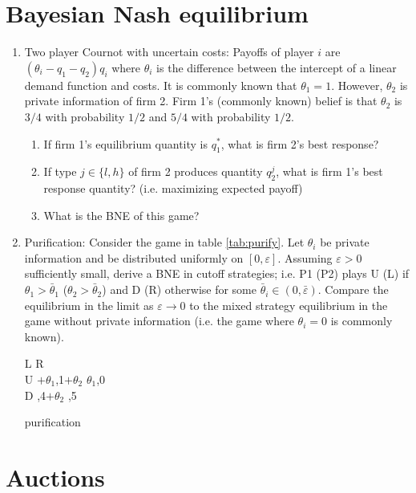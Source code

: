 \documentclass[a4paper,12pt]{article}
\begin{document}
\section{Bayesian Nash equilibrium}
\label{sec:Bayes-nash-eq}
\begin{enumerate}
\item Two player Cournot with uncertain costs: Payoffs of player $i$ are $(\theta _i-q_1-q_2)q_i$ where $\theta _i$ is the difference between the intercept of a linear demand function and costs. It is commonly known that $\theta _1=1$. However, $\theta _2$ is private information of firm 2. Firm 1's (commonly known) belief is that $\theta _2$ is $3/4$ with probability $1/2$ and $5/4$ with probability $1/2$.
  \begin{enumerate}
  \item If firm 1's equilibrium quantity is $q_1^*$, what is firm 2's best response?
  \item If type $j\in\{l,h\}$ of firm 2 produces quantity $q_2^j$, what is firm 1's best response quantity? (i.e. maximizing expected payoff)
    \item What is the BNE of this game?
  \end{enumerate}
\item Purification: Consider the game in table \ref{tab:purify}. Let $\theta _i$ be private information and be distributed uniformly on $[0 ,\varepsilon ]$. Assuming $\varepsilon >0$ sufficiently small, derive a BNE in cutoff strategies; i.e. P1 (P2) plays U (L) if $\theta _1>\bar{\theta }_1$ ($\theta _2>\bar{\theta }_2$) and D (R) otherwise for some $\bar \theta_i\in(0,\bar{\varepsilon })$. Compare the equilibrium in the limit as $\varepsilon \rightarrow 0$ to the mixed strategy equilibrium in the game without private information (i.e. the game where $\theta _i=0$ is commonly known). 
     \begin{table}[h]
\centering
 \begin{game}{2}{2}
       \> L  \>R\\ %
U   $+\theta_1$,1$+\theta _2$    \> $\theta_1$,0   \\
D  ,4$+\theta _2$    ,5
\end{game}  
\caption{purification}
\label{tab:purify}
\end{table}
\end{enumerate}

\section{Auctions}
\label{sec:auctions}
\end{document}
